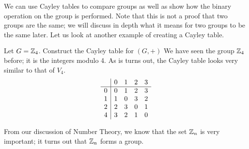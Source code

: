 We can use Cayley tables to compare groups as well as show how the binary operation on the group is performed.
Note that this is not a proof that two groups are the same; we will discuss in depth what it means for two groups to be the same later.
Let us look at another example of creating a Cayley table.

\begin{example}{Let $G=\mathbb{Z}_{4}$. Construct the Cayley table for $(G,+)$}
	We have seen the group $\mathbb{Z}_{4}$ before; it is the integers modulo 4. As is turns out, the Cayley table looks very similar to that of $V_{4}$.
	\[
		\begin{array}{c | c c c c}
			& 0 & 1 & 2 & 3\\
			\hline
			0 & 0 & 1 & 2 & 3\\
			1 & 1 & 0 & 3 & 2\\
			2 & 2 & 3 & 0 & 1\\
			4 & 3 & 2 & 1 & 0
		\end{array}
	\]
\end{example}

From our discussion of Number Theory, we know that the set $\mathbb{Z}_{n}$ is very important; it turns out that $\mathbb{Z}_{n}$ forms a group.

